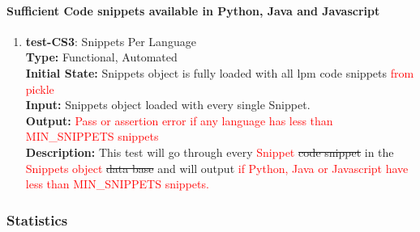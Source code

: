 \documentclass[12pt, titlepage]{article}
\begin{document}
\paragraph{Sufficient Code snippets available in Python, Java and Javascript}
\begin{enumerate}

\item{\textbf{test-CS3}: Snippets Per Language} \\
\textbf{Type:} Functional, Automated \\
\textbf{Initial State:} Snippets object is fully loaded with all lpm code snippets \textcolor{red}{from pickle}\\
\textbf{Input:} Snippets object loaded with every single Snippet. \\
\textbf{Output:} \textcolor{red}{Pass or assertion error if any language has less than MIN\_SNIPPETS snippets}\\
\textbf{Description:} This test will go through every \textcolor{red}{Snippet} \sout{code snippet} in the \textcolor{red}{Snippets object} \sout{data base} and will output \textcolor{red}{if Python, Java or Javascript have less than  MIN\_SNIPPETS snippets.}\\

\end{enumerate}

\subsubsection{Statistics}
\end{document}

